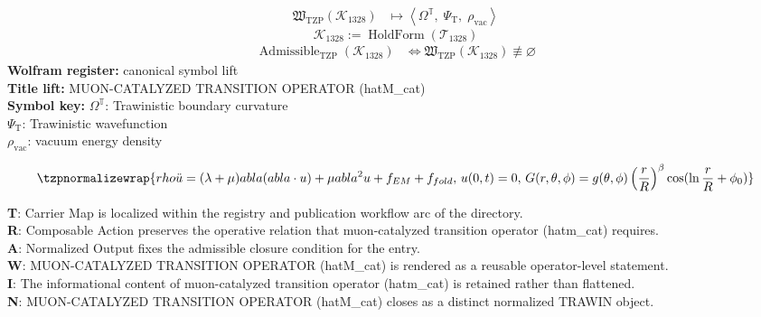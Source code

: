 \noindent
\begin{minipage}[t]{0.48\linewidth}
\begingroup
\small
\[
\begin{aligned}
\mathfrak{W}_{\mathrm{TZP}}\!\left(\mathcal{K}_{1328}\right)
&\longmapsto
\left\langle \Omega^{\mathbb{T}},\; \Psi_{\mathrm{T}},\; \rho_{\mathrm{vac}} \right\rangle
\end{aligned}
\]
\[
\mathcal{K}_{1328}
:=
\operatorname{HoldForm}\!\left(\mathcal{T}_{1328}\right)
\]
\[
\begin{aligned}
\operatorname{Admissible}_{\mathrm{TZP}}\!\left(\mathcal{K}_{1328}\right)
&\Longleftrightarrow
\mathfrak{W}_{\mathrm{TZP}}\!\left(\mathcal{K}_{1328}\right)\not\equiv\varnothing
\end{aligned}
\]
\textbf{Wolfram register:} canonical symbol lift\\
\textbf{Title lift:} MUON-CATALYZED TRANSITION OPERATOR (hatM\_cat)\\
\textbf{Symbol key:} \(\Omega^{\mathbb{T}}\): Trawinistic boundary curvature\\ \(\Psi_{\mathrm{T}}\): Trawinistic wavefunction\\ \(\rho_{\mathrm{vac}}\): vacuum energy density
\par
\endgroup
\end{minipage}\hfill
\begin{minipage}[t]{0.48\linewidth}
\[
\tzpnormalizewrap{rho \ddot{u} = (\lambda + \mu)  abla( abla \cdot u) + \mu  abla^2 u + f_{EM} + f_{fold},\,u(0,t) = 0,\,G(r, \theta, \phi) = g(\theta, \phi) \left(\frac{r}{R}\right)^\beta \cos(\ln \frac{r}{R} + \phi_0)}
\]

\small
\textbf{T}: Carrier Map is localized within the registry and publication workflow arc of the directory.\\
\textbf{R}: Composable Action preserves the operative relation that muon-catalyzed transition operator (hatm\_cat) requires.\\
\textbf{A}: Normalized Output fixes the admissible closure condition for the entry.\\
\textbf{W}: MUON-CATALYZED TRANSITION OPERATOR (hatM\_cat) is rendered as a reusable operator-level statement.\\
\textbf{I}: The informational content of muon-catalyzed transition operator (hatm\_cat) is retained rather than flattened.\\
\textbf{N}: MUON-CATALYZED TRANSITION OPERATOR (hatM\_cat) closes as a distinct normalized TRAWIN object.
\normalsize
\end{minipage}

